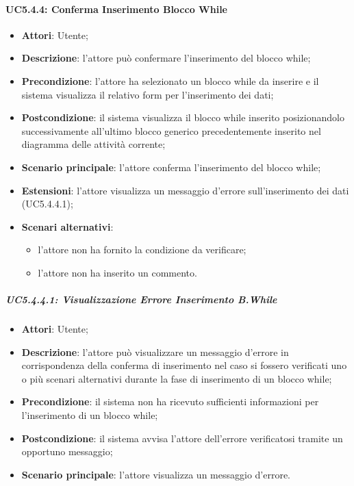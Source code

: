 \paragraph{UC5.4.4: Conferma Inserimento Blocco While}
\label{UC5.4.4}
\begin{itemize}
\item \textbf{Attori}: Utente;
\item \textbf{Descrizione}: l'attore può confermare l'inserimento del blocco while;	
\item \textbf{Precondizione}: l'attore ha selezionato un blocco while da inserire e il sistema visualizza il relativo form per l'inserimento dei dati;	
\item \textbf{Postcondizione}: il sistema visualizza il blocco while inserito posizionandolo successivamente all'ultimo blocco generico precedentemente inserito nel diagramma delle attività corrente;	
\item \textbf{Scenario principale}:
l'attore conferma l'inserimento del blocco while;	
\item \textbf{Estensioni}:
l'attore visualizza un messaggio d'errore sull'inserimento dei dati (UC5.4.4.1);	
\item \textbf{Scenari alternativi}:
\begin{itemize}
\item l'attore non ha fornito la condizione da verificare;
\item l'attore non ha inserito un commento.
\end{itemize}
\end{itemize}

\subparagraph{UC5.4.4.1: Visualizzazione Errore Inserimento B.While}
\label{UC5.4.4.1}
\begin{itemize}
\item \textbf{Attori}: Utente;
\item \textbf{Descrizione}: l'attore può visualizzare un messaggio d'errore in corrispondenza della conferma di inserimento nel caso si fossero verificati uno o più scenari alternativi durante la fase di inserimento di un blocco while;	
\item \textbf{Precondizione}: il sistema non ha ricevuto sufficienti informazioni per l'inserimento di un blocco while;	
\item \textbf{Postcondizione}: il sistema avvisa l'attore dell'errore verificatosi tramite un opportuno messaggio;	
\item \textbf{Scenario principale}:
l'attore visualizza un messaggio d'errore.	
\end{itemize}

